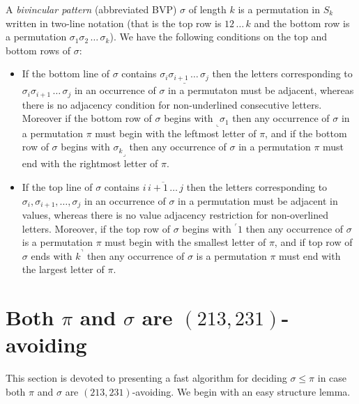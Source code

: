 \documentclass[a4paper]{llncs}
\begin{document}
A \emph{bivincular pattern} (abbreviated BVP) $\sigma$
of length $k$ is a permutation in $S_k$ written in
two-line notation 
(that is the top row is $12\,\ldots\,k$ and the bottom row
is a permutation $\sigma_1\sigma_2\,\ldots\,\sigma_k$).
We have the following conditions on the top and bottom rows
of $\sigma$:
\begin{itemize}
	\item
	If the bottom line of $\sigma$ contains
	$\underline{\sigma_i\sigma_{i+1}\,\ldots\,\sigma_j}$
	then the letters corresponding to 
	$\sigma_i\sigma_{i+1}\,\ldots\,\sigma_j$ in an occurrence of
	$\sigma$ in a permutaton must be adjacent, whereas there is
	no adjacency condition for
	non-underlined consecutive letters.
	Moreover if the bottom row of $\sigma$ begins with
	$_\llcorner{\sigma_1}$ then any occurrence of $\sigma$ 
	in a permutation $\pi$ must begin with the leftmost 
	letter of $\pi$,
	and 
	if the bottom row of $\sigma$ begins with
	${\sigma_k}_\lrcorner$ then any occurrence of $\sigma$ 
	in a permutation $\pi$ must end with the rightmost 
	letter of $\pi$.
	\item
	If the top line of $\sigma$ contains
	$\overline{i\,i+1\,\ldots\,j}$ then the letters corresponding to
	$\sigma_i, \sigma_{i+1}, \ldots, \sigma_j$ in an
	occurrence of $\sigma$ in a permutation must be adjacent in values,
	whereas there is no value adjacency restriction for non-overlined 
	letters.
	Moreover, if the top row of $\sigma$ begins with
	$^\ulcorner{1}$ then
	any occurrence of $\sigma$ is a permutation $\pi$ must begin with
	the smallest letter of $\pi$, and
	if top row of $\sigma$ ends with $k^\urcorner$ then
	any occurrence of $\sigma$ is a permutation $\pi$ must end with
	the largest letter of $\pi$.
\end{itemize}


\section{Both $\pi$ and $\sigma$ are $(213,231)$-avoiding}
\label{section:both are (231,213)-avoiding}

This section is devoted to presenting a fast algorithm for deciding
$\sigma \leq \pi$ 
in case both $\pi$ and $\sigma$ are $(213,231)$-avoiding.
We begin with an easy structure lemma.
\end{document}

